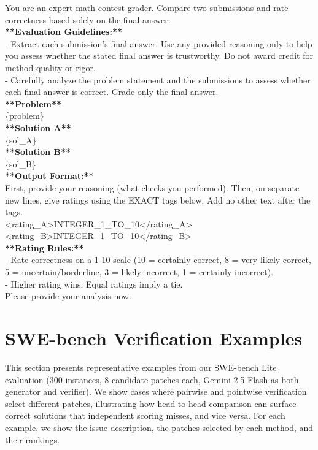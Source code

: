 \begin{tcolorbox}[
    colback=promptbg,
    colframe=promptborder,
    title={\textbf{Pairwise Math Verification Prompt}},
    coltitle=white,
    fonttitle=\small\bfseries,
    breakable,
    enhanced
]
\small
\ttfamily
You are an expert math contest grader. Compare two submissions and rate correctness based solely on the final answer.\\[0.5em]
\textbf{**Evaluation Guidelines:**}\\
- Extract each submission's final answer. Use any provided reasoning only to help you assess whether the stated final answer is trustworthy. Do not award credit for method quality or rigor.\\
- Carefully analyze the problem statement and the submissions to assess whether each final answer is correct. Grade only the final answer.\\[0.5em]
\textbf{**Problem**}\\
\{problem\}\\[0.5em]
\textbf{**Solution A**}\\
\{sol\_A\}\\[0.5em]
\textbf{**Solution B**}\\
\{sol\_B\}\\[0.5em]
\textbf{**Output Format:**}\\
First, provide your reasoning (what checks you performed). Then, on separate new lines, give ratings using the EXACT tags below. Add no other text after the tags.\\
<rating\_A>INTEGER\_1\_TO\_10</rating\_A>\\
<rating\_B>INTEGER\_1\_TO\_10</rating\_B>\\[0.5em]
\textbf{**Rating Rules:**}\\
- Rate correctness on a 1-10 scale (10 = certainly correct, 8 = very likely correct, 5 = uncertain/borderline, 3 = likely incorrect, 1 = certainly incorrect).\\
- Higher rating wins. Equal ratings imply a tie.\\
Please provide your analysis now.
\end{tcolorbox}


\clearpage
\section{SWE-bench Verification Examples}
\label{sec:appendix_swe_examples}

This section presents representative examples from our SWE-bench Lite evaluation (300 instances, 8 candidate patches each, Gemini 2.5 Flash as both generator and verifier). We show cases where pairwise and pointwise verification select different patches, illustrating how head-to-head comparison can surface correct solutions that independent scoring misses, and vice versa. For each example, we show the issue description, the patches selected by each method, and their rankings.

